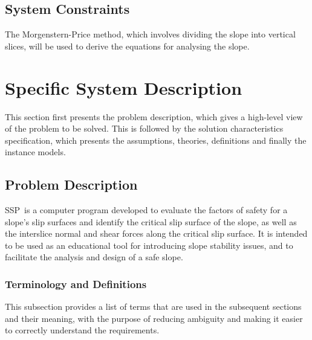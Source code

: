 \documentclass[12pt]{article}
\newcommand{\progname}{SSP}
\begin{document}
\subsection{System Constraints} \label{sec_SystConstraints}

The Morgenstern-Price method, which involves dividing the slope into vertical 
slices, will be used to derive the equations for analysing the slope. 

\section{Specific System Description}

This section first presents the problem description, which gives a
high-level view of the problem to be solved.  This is followed by the
solution characteristics specification, which presents the
assumptions, theories, definitions and finally the instance models.

\subsection{Problem Description} \label{Sec_pd}

\progname\ is a computer program developed to evaluate the factors of safety 
for a slope's slip surfaces and identify the critical slip surface of the 
slope, as well as the interslice normal and shear forces along the critical 
slip surface. It is intended to be used as an educational tool for introducing 
slope stability issues, and to facilitate the analysis and design of a safe 
slope.

\subsubsection{Terminology and Definitions}

This subsection provides a list of terms that are used in the subsequent
sections and their meaning, with the purpose of reducing ambiguity and
 making it easier to correctly understand the requirements.
\end{document}
